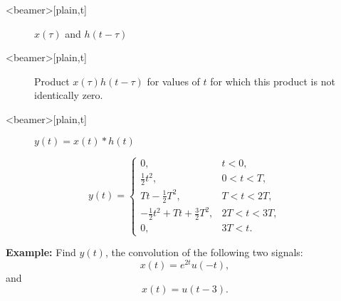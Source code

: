 \begin{frame}<beamer>[plain,t]
    {
    \begin{figure}
      \centering
      
      \caption{$x(\tau)$ and $h(t-\tau)$}\label{fi:ct_conv_example27}
    \end{figure}
    }
\end{frame}


\begin{frame}<beamer>[plain,t]
    {
    \begin{figure}
      \centering
      
      \caption{Product $x(\tau)h(t-\tau)$ for values of $t$ for which this product is not identically zero.}\label{fi:ct_conv_example27working}
    \end{figure}
    }
\end{frame}

\begin{frame}<beamer>[plain,t]
    {
    \begin{figure}
      \centering
      
      \caption{$y(t) = x(t)\ast h(t)$}\label{fi:ct_conv_example27sol}
    \end{figure}
    }
    \begin{equation*}
        y(t) = \begin{cases}
                0 , & t < 0,\\
                \frac{1}{2}t^2 , & 0< t < T, \\
                Tt - \frac{1}{2}T^2 , & T< t < 2T,\\
                -\frac{1}{2}t^2 + Tt + \frac{3}{2}T^2 , & 2T< t < 3T, \\
                0, & 3T < t.
               \end{cases}
    \end{equation*}
\end{frame}


\begin{frame}{}
    \textbf{ Example: } Find $y(t)$, the convolution of the following two signals:
    \begin{equation*}
        x(t) = e^{2t}u(-t),
    \end{equation*}
    and
    \begin{equation*}
        x(t) = u(t-3).
    \end{equation*}


    {
        \begin{columns}
        \end{columns}
    }
\end{frame}


